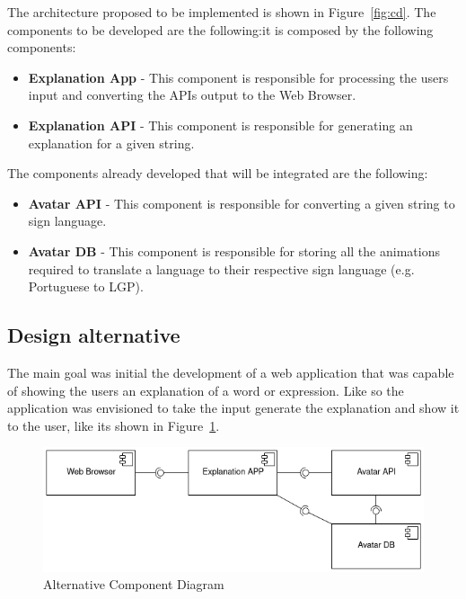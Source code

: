 The architecture proposed to be implemented is shown in Figure~\ref{fig:cd}.
The components to be developed are the following:it is composed by the following components:

\begin{itemize}
    \item \textbf{Explanation App} - This component is responsible for processing the users input and converting the APIs output to the Web Browser.
    \item \textbf{Explanation API} - This component is responsible for generating an explanation for a given string.
\end{itemize}

The components already developed that will be integrated are the following:
\begin{itemize}
    \item \textbf{Avatar API} - This component is responsible for converting a given string to sign language.
    \item \textbf{Avatar DB} - This component is responsible for storing all the animations required to translate a language to their respective sign language (e.g. Portuguese to \gls{LGP}).
\end{itemize}

\subsection{Design alternative}

The main goal was initial the development of a web application that was capable of showing the users an explanation of a word or expression.
Like so the application was envisioned to take the input generate the explanation and show it to the user, like its shown in Figure~\ref{fig:ocd}.

\begin{figure}[H]
\centering
\includegraphics[width=\textwidth,keepaspectratio]{ch4/assets/component_diagram_alternative.png}
\caption[Alternative Component Diagram]{Alternative Component Diagram}
\label{fig:ocd}
\end{figure}

